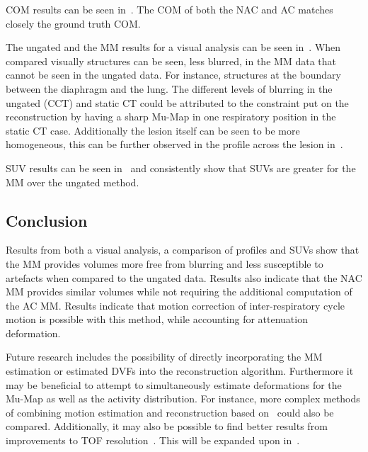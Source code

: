             \gls{COM} results can be seen in~. The \gls{COM} of both the \gls{NAC} and \gls{AC} matches closely the ground truth \gls{COM}.
            
            The ungated and the \gls{MM} results for a visual analysis can be seen in~. When compared visually structures can be seen, less blurred, in the \gls{MM} data that cannot be seen in the ungated data. For instance, structures at the boundary between the diaphragm and the lung. The different levels of blurring in the ungated (\gls{CCT}) and static \gls{CT} could be attributed to the constraint put on the reconstruction by having a sharp \gls{Mu-Map} in one respiratory position in the static \gls{CT} case. Additionally the lesion itself can be seen to be more homogeneous, this can be further observed in the profile across the lesion in~.
             
            \gls{SUV} results can be seen in~ and consistently show that \glspl{SUV} are greater for the \gls{MM} over the ungated method.
            
        \subsection{Conclusion} \label{sec:pet_ct_respiratory_motion_correction_with_a_single_attenuation_map_using_nac_derived_deformation_fields_conclusion}
            Results from both a visual analysis, a comparison of profiles and \glspl{SUV} show that the \gls{MM} provides volumes more free from blurring and less susceptible to artefacts when compared to the ungated data. Results also indicate that the \gls{NAC} \gls{MM} provides similar volumes while not requiring the additional computation of the \gls{AC} \gls{MM}. Results indicate that motion correction of inter-respiratory cycle motion is possible with this method, while accounting for attenuation deformation.
            
            Future research includes the possibility of directly incorporating the \gls{MM} estimation or estimated \glspl{DVF} into the reconstruction algorithm. Furthermore it may be beneficial to attempt to simultaneously estimate deformations for the \gls{Mu-Map} as well as the activity distribution. For instance, more complex methods of combining motion estimation and reconstruction based on~\parencite{Bousse2016a, Bousse2016} could also be compared. Additionally, it may also be possible to find better results from improvements to \gls{TOF} resolution~\parencite{Nikos2019, Efthimiou2017, efth2016}. This will be expanded upon in~.
    
